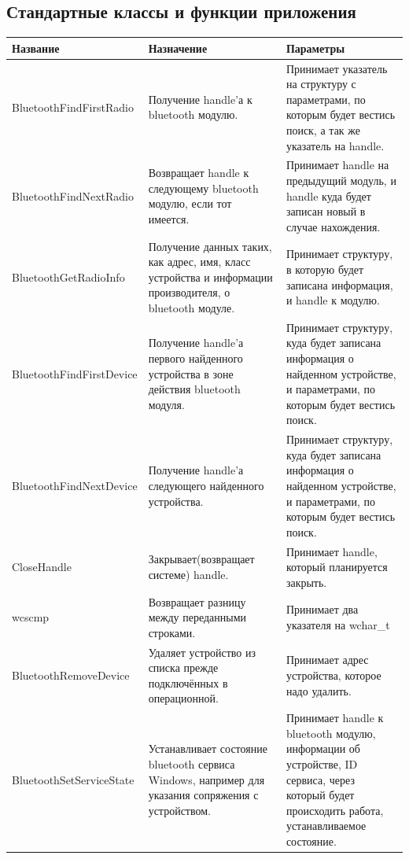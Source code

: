 \subsection{Стандартные классы и функции приложения}
\begin{tabularx}{\linewidth}{|X|X|X|}
    \hline
        Название & Назначение & Параметры \\ \hline
        BluetoothFindFirstRadio & Получение handle'а к bluetooth модулю.
        & Принимает указатель на структуру с параметрами, по которым будет вестись поиск, а так же указатель на handle. \\ \hline
        BluetoothFindNextRadio & Возвращает handle к следующему bluetooth модулю, если тот имеется.
        & Принимает handle на предыдущий модуль, и handle куда будет записан новый в случае нахождения. \\ \hline
        BluetoothGetRadioInfo & Получение данных таких, как адрес, имя, класс устройства и информации производителя, о bluetooth модуле.
        & Принимает структуру, в которую будет записана информация, и handle к модулю. \\ \hline
        BluetoothFindFirstDevice & Получение handle'а первого найденного устройства в зоне действия bluetooth модуля.
        & Принимает структуру, куда будет записана информация о найденном устройстве, и параметрами, по которым будет вестись поиск. \\ \hline
        BluetoothFindNextDevice & Получение handle'а следующего найденного устройства.
        & Принимает структуру, куда будет записана информация о найденном устройстве, и параметрами, по которым будет вестись поиск. \\ \hline
        CloseHandle & Закрывает(возвращает системе) handle.
        & Принимает handle, который планируется закрыть. \\ \hline
        wcscmp & Возвращает разницу между переданными строками.
        & Принимает два указателя на wchar\_t \\ \hline
        BluetoothRemoveDevice & Удаляет устройство из списка прежде подключённых в операционной.
        & Принимает адрес устройства, которое надо удалить. \\ \hline
        BluetoothSetServiceState & Устанавливает состояние bluetooth сервиса Windows, например для указания сопряжения с устройством.
        & Принимает handle к bluetooth модулю, информации об устройстве, ID сервиса, через который будет происходить работа, устанавливаемое состояние. \\ \hline

\end{tabularx}
